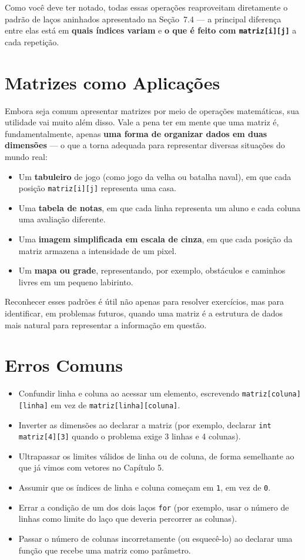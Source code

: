 \documentclass[12pt,a4paper,oneside]{extreport}
\begin{document}
Como você deve ter notado, todas essas operações reaproveitam diretamente o padrão de laços aninhados apresentado na Seção~7.4 — a principal diferença entre elas está em \textbf{quais índices variam} e \textbf{o que é feito com \texttt{matriz[i][j]}} a cada repetição.

\section{Matrizes como Aplicações}

Embora seja comum apresentar matrizes por meio de operações matemáticas, sua utilidade vai muito além disso. Vale a pena ter em mente que uma matriz é, fundamentalmente, apenas \textbf{uma forma de organizar dados em duas dimensões} — o que a torna adequada para representar diversas situações do mundo real:

\begin{itemize}
    \item Um \textbf{tabuleiro} de jogo (como jogo da velha ou batalha naval), em que cada posição \texttt{matriz[i][j]} representa uma casa.
    \item Uma \textbf{tabela de notas}, em que cada linha representa um aluno e cada coluna uma avaliação diferente.
    \item Uma \textbf{imagem simplificada em escala de cinza}, em que cada posição da matriz armazena a intensidade de um pixel.
    \item Um \textbf{mapa ou grade}, representando, por exemplo, obstáculos e caminhos livres em um pequeno labirinto.
\end{itemize}

Reconhecer esses padrões é útil não apenas para resolver exercícios, mas para identificar, em problemas futuros, quando uma matriz é a estrutura de dados mais natural para representar a informação em questão.

\section{Erros Comuns}

\begin{itemize}
    \item Confundir linha e coluna ao acessar um elemento, escrevendo \texttt{matriz[coluna][linha]} em vez de \texttt{matriz[linha][coluna]}.
    \item Inverter as dimensões ao declarar a matriz (por exemplo, declarar \texttt{int matriz[4][3]} quando o problema exige 3 linhas e 4 colunas).
    \item Ultrapassar os limites válidos de linha ou de coluna, de forma semelhante ao que já vimos com vetores no Capítulo 5.
    \item Assumir que os índices de linha e coluna começam em \texttt{1}, em vez de \texttt{0}.
    \item Errar a condição de um dos dois laços \texttt{for} (por exemplo, usar o número de linhas como limite do laço que deveria percorrer as colunas).
    \item Passar o número de colunas incorretamente (ou esquecê-lo) ao declarar uma função que recebe uma matriz como parâmetro.
\end{itemize}
\end{document}
